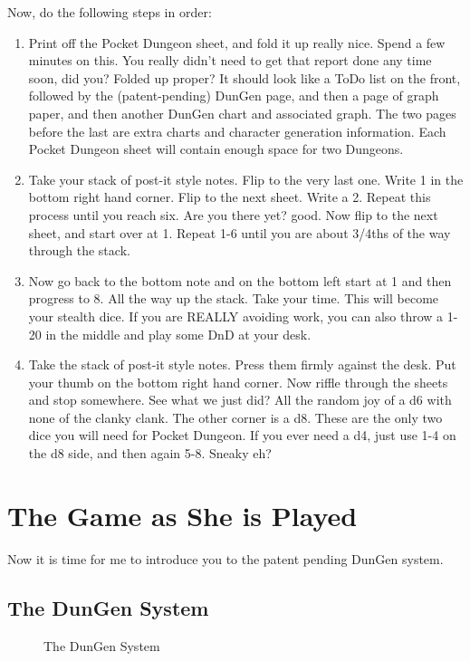 \documentclass[a6paper,hidelinks]{article}
\begin{document}
Now, do the following steps in order:
\begin{enumerate}
\item Print off the Pocket Dungeon sheet, and fold it up really nice. Spend a few minutes on this. You really didn't need to get that report done any time soon, did you? Folded up proper? It should look like a ToDo list on the front, followed by the (patent-pending) DunGen page, and then a page of graph paper, and then another DunGen chart and associated graph. The two pages before the last are extra charts and character generation information. Each Pocket Dungeon sheet will contain enough space for two Dungeons.
\item Take your stack of post-it style notes. Flip to the very last one. Write 1 in the bottom right hand corner. Flip to the next sheet. Write a 2. Repeat this process until you reach six. Are you there yet? good. Now flip to the next sheet, and start over at 1. Repeat 1-6 until you are about 3/4ths of the way through the stack.
\item Now go back to the bottom note and on the bottom left start at 1 and then progress to 8. All the way up the stack. Take your time. This will become your
stealth dice. If you are REALLY avoiding work, you can also throw a 1-20 in the middle and play some DnD at your desk.
\item Take the stack of post-it style notes. Press them firmly against the desk. Put your thumb on the bottom right hand corner. Now riffle through the sheets and stop somewhere. See what we just did? All the random joy of a d6 with none of the clanky clank. The other corner is a d8. These are the only two dice you will need for Pocket Dungeon. If you ever need a d4, just use 1-4 on the d8 side, and then again 5-8. Sneaky eh?

\end{enumerate}

\section{The Game as She is Played}

Now it is time for me to introduce you to the patent pending DunGen system.

\subsection{The DunGen System}

\begin{figure}[h]
\caption{The DunGen System}
\label{fig:the_dungen_system}

\end{figure}
\end{document}
